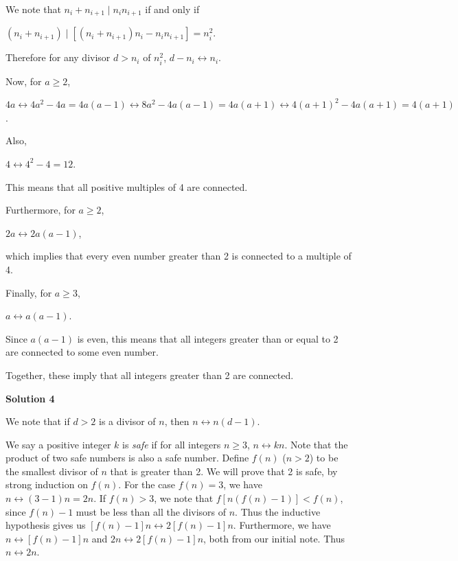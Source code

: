 \begin{enumerate}
We note that $n_i + n_{i+1} \mid n_in_{i+1}$ if and only if

 $(n_i + n_{i+1}) \mid [(n_i + n_{i+1})n_i - n_in_{i+1}] = n_i^2$.

 

 Therefore for any divisor $d > n_i$ of $n_i^2$, $d - n_i \leftrightarrow n_i$.

 Now, for $a \ge 2$,

 $4a \leftrightarrow 4a^2 - 4a = 4a(a-1) \leftrightarrow 8a^2 - 4a(a-1) = 4a(a+1) \leftrightarrow 4(a+1)^2 - 4a(a+1) = 4(a+1)$.

 

 Also,

 $4 \leftrightarrow 4^2 - 4 = 12$.

 

 This means that all positive multiples of 4 are connected.

 Furthermore, for $a \ge 2$,

 $2a \leftrightarrow 2a(a-1)$,

 

 which implies that every even number greater than 2 is connected to a multiple of 4.

 Finally, for $a \ge 3$,

 $a \leftrightarrow a(a-1)$.

 

 Since $a(a-1)$ is even, this means that all integers greater than or equal to 2 are connected to some even number.

 Together, these imply that all integers greater than 2 are connected.

 



\textbf{Solution 4}

We note that if $d > 2$ is a divisor of $n$, then $n \leftrightarrow n(d-1)$.

 We say a positive integer $k$ is \textit{safe} if for all integers $n \ge 3$, $n \leftrightarrow kn$.  Note that the product of two safe numbers is also a safe number.  Define $f(n)$ ($n>2$) to be the smallest divisor of $n$ that is greater than 2.  We will prove that 2 is safe, by strong induction on $f(n)$.  For the case $f(n) = 3$, we have $n \leftrightarrow (3-1)n = 2n$.  If $f(n) > 3$, we note that $f[n(f(n) - 1)] < f(n)$, since $f(n) - 1$ must be less than all the divisors of $n$.  Thus the inductive hypothesis gives us $[f(n) - 1]n \leftrightarrow 2[f(n) - 1]n$.  Furthermore, we have $n \leftrightarrow [f(n)-1]n$ and $2n \leftrightarrow 2[f(n)-1]n$, both from our initial note.  Thus $n \leftrightarrow 2n$.


\end{enumerate}
